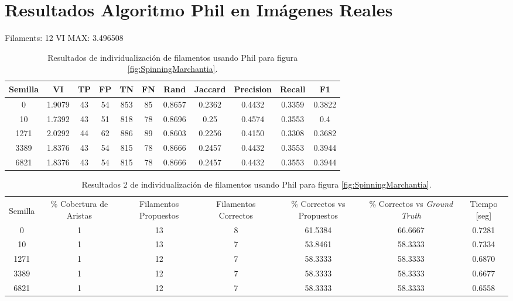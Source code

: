 \section{Resultados Algoritmo Phil en Im\'agenes Reales}

Filaments: 12	VI MAX: 3.496508
\begin{table}[h]
    \centering
    \begin{tabular}{|c|c|c|c|c|c|c|c|c|c|c|}
    \hline
        Semilla & VI & TP & FP &TN &FN & Rand	& Jaccard &	Precision &	Recall &	F1 \\ \hline 
        0    & 1.9079 & 43 & 54 & 853 & 85 & 0.8657 & 0.2362 & 0.4432 & 0.3359 & 0.3822 \\
        10   & 1.7392 & 43 & 51 & 818 & 78 & 0.8696 & 0.25 & 0.4574 & 0.3553 & 0.4 \\
        1271 & 2.0292 & 44 & 62 & 886 & 89 & 0.8603 & 0.2256 & 0.4150 & 0.3308 & 0.3682 \\
        3389 & 1.8376 & 43 & 54 & 815 & 78 & 0.8666 & 0.2457 & 0.4432 & 0.3553 & 0.3944 \\
        6821 & 1.8376 & 43 & 54 & 815 & 78 & 0.8666 & 0.2457 & 0.4432 & 0.3553 & 0.3944 \\
        \hline
    \end{tabular}
    \caption{Resultados de individualizaci\'on de filamentos usando Phil para figura \ref{fig:SpinningMarchantia}.}
    \label{tab:SpinningMarchantiaDetailedResults1}
\end{table}

\begin{table}[h]
    \centering
    \begin{tabular}{|c|c|c|c|c|c|c|}
    \hline
         & \multirow{4}{2cm}{\centering \% Cobertura de Aristas} & \multirow{4}{2cm}{Filamentos Propuestos} & \multirow{4}{2cm}{Filamentos Correctos} & \multirow{4}{2.5cm}{\% Correctos vs Propuestos} & \multirow{4}{2.5cm}{\centering \% Correctos vs {\it Ground Truth}} & \multirow{4}{1.2cm}{\centering Tiempo [seg]} \\
         &  &  &  & & &  \\
        Semilla &  &  &  & & &  \\
        &  &  &  & & &  \\ \hline 
        0 & 1 & 13 & 8 & 61.5384 & 66.6667 & 0.7281  \\
        10 & 1 & 13 & 7 & 53.8461 & 58.3333 & 0.7334\\
        1271 & 1 & 12 & 7 & 58.3333 & 58.3333 & 0.6870\\
        3389 & 1 & 12 & 7 & 58.3333 & 58.3333 & 0.6677\\
        6821 & 1 & 12 & 7 & 58.3333 & 58.3333 & 0.6558\\
        \hline
    \end{tabular}
    \caption{Resultados 2 de individualizaci\'on de filamentos usando Phil para figura \ref{fig:SpinningMarchantia}.}
    \label{tab:SpinningMarchantiaDetailedResults2}
\end{table}


